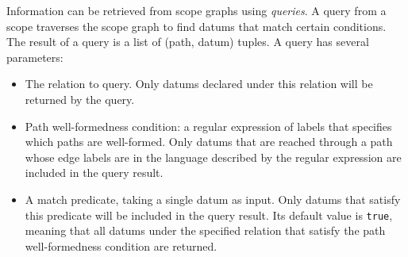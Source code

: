 Information can be retrieved from scope graphs using \textit{queries}. A query from a scope traverses the scope graph to find datums that match certain conditions. The result of a query is a list of (path, datum) tuples. A query has several parameters:
\begin{itemize}
	\item The relation to query. Only datums declared under this relation will be returned by the query.
	\item Path well-formedness condition: a regular expression of labels that specifies which paths are well-formed. Only datums that are reached through a path whose edge labels are in the language described by the regular expression are included in the query result.
	\item A match predicate, taking a single datum as input. Only datums that satisfy this predicate will be included in the query result. Its default value is \verb|true|, meaning that all datums under the specified relation that satisfy the path well-formedness condition are returned.
\end{itemize}
